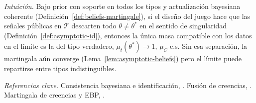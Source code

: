 \documentclass[12pt]{article}
\providecommand{\textcite}{\citet}
\theoremstyle{definition}
\theoremstyle{remark}
\newcommand{\1}{\mathbf{1}}
\begin{document}
\noindent\emph{Intuición.} Bajo prior con soporte en todos los tipos y actualización bayesiana coherente \textup{(}Definición~\ref{def:beliefs-martingale}\textup{)}, si el diseño del juego hace que las señales públicas en $\mathcal{T}$ descarten todo $\theta\neq\theta^\ast$ en el sentido de singularidad \textup{(}Definición~\ref{def:asymptotic-id}\textup{)}, entonces la única masa compatible con los datos en el límite es la del tipo verdadero, $\mu_t(\theta^\ast)\to 1$, $\mu_C$-c.s. Sin esa separación, la martingala aún converge \textup{(}Lema~\ref{lem:asymptotic-beliefs}\textup{)} pero el límite puede repartirse entre tipos indistinguibles.

\noindent\emph{Referencias clave.} Consistencia bayesiana e identificación, \textcite{Schervish1995Theory}. Fusión de creencias, \textcite{BlackwellDubins1962}. Martingala de creencias y EBP, \textcite{Williams1991Martingales,FudenbergTirole1991}.
\end{document}
